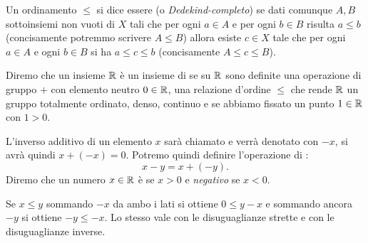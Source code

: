 \begin{definition}
  Un ordinamento $\le$ si dice essere
  (o \emph{Dedekind-completo})
  se dati comunque $A,B$ sottoinsiemi non vuoti di $X$
    tali che per ogni $a\in A$ e per ogni $b\in B$ risulta $a\le b$
    (concisamente potremmo scrivere $A\le B$)
    allora esiste $c\in X$ tale che per ogni $a\in A$ e ogni $b\in B$ 
    si ha $a\le c \le b$ (concisamente $A\le c \le B$).
\end{definition}
  
\begin{definition}
  \label{def:reali}%
  \index{$\RR$}%
  Diremo che un insieme $\RR$ è un insieme di  
  se su $\RR$ sono definite una operazione di gruppo $+$ 
  con elemento neutro $0\in {\mathbb R}$, una relazione d'ordine $\le$ 
  che rende $\RR$ un gruppo totalmente ordinato, denso, continuo
  e se abbiamo fissato un punto $1\in {\mathbb R}$ con $1>0$.
\end{definition}

L'inverso additivo di un elemento $x$ sarà chiamato 
 e verrà denotato con $-x$, si avrà quindi $x + (-x) = 0$.
Potremo quindi definire l'operazione di :
\[
    x - y = x + (-y).
\]
Diremo che un numero $x\in {\mathbb R}$ è  
%
%
%
se $x>0$ e \emph{negativo} se $x<0$.

Se $x\le y$ sommando $-x$ da ambo i lati si ottiene 
$0 \le y-x$ e sommando ancora $-y$ si ottiene 
$-y \le -x$. Lo stesso vale con le disuguaglianze strette
e con le disuguaglianze inverse.


